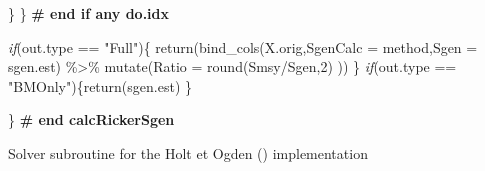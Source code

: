 \documentclass[french,11pt]{book}
\newenvironment{Shaded}{\begin{snugshade}}{\end{snugshade}}
\newcommand{\AttributeTok}[1]{\textcolor[rgb]{0.77,0.63,0.00}{#1}}
\newcommand{\CommentTok}[1]{\textcolor[rgb]{0.56,0.35,0.01}{\textbf{#1}}}
\newcommand{\ControlFlowTok}[1]{\textcolor[rgb]{0.13,0.29,0.53}{\textit{#1}}}
\newcommand{\DecValTok}[1]{\textcolor[rgb]{0.00,0.00,0.81}{#1}}
\newcommand{\FunctionTok}[1]{\textcolor[rgb]{0.00,0.00,0.00}{#1}}
\newcommand{\NormalTok}[1]{#1}
\newcommand{\SpecialCharTok}[1]{\textcolor[rgb]{0.00,0.00,0.00}{#1}}
\newcommand{\StringTok}[1]{\textcolor[rgb]{0.31,0.60,0.02}{#1}}
\begin{document}
\begin{Shaded}
\begin{Highlighting}[]
\NormalTok{  \}}
\NormalTok{\} }\CommentTok{\# end if any do.idx}

\ControlFlowTok{if}\NormalTok{(out.type }\SpecialCharTok{==} \StringTok{"Full"}\NormalTok{)\{}
          \FunctionTok{return}\NormalTok{(}\FunctionTok{bind\_cols}\NormalTok{(X.orig,}\AttributeTok{SgenCalc =}\NormalTok{ method,}\AttributeTok{Sgen =}\NormalTok{ sgen.est) }\SpecialCharTok{\%\textgreater{}\%} 
                        \FunctionTok{mutate}\NormalTok{(}\AttributeTok{Ratio =} \FunctionTok{round}\NormalTok{(Smsy}\SpecialCharTok{/}\NormalTok{Sgen,}\DecValTok{2}\NormalTok{) )) \}}
\ControlFlowTok{if}\NormalTok{(out.type }\SpecialCharTok{==} \StringTok{"BMOnly"}\NormalTok{)\{}\FunctionTok{return}\NormalTok{(sgen.est)  \}}

\NormalTok{\} }\CommentTok{\# end calcRickerSgen}
\end{Highlighting}
\end{Shaded}
Solver subroutine for the Holt et Ogden () implementation
\end{document}

